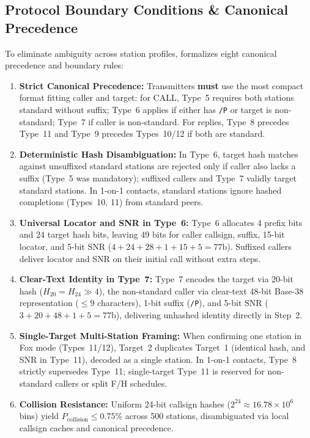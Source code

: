 \subsection{Protocol Boundary Conditions \& Canonical Precedence}
\label{sec:msg:limitations}

To eliminate ambiguity across station profiles, \LQ{} formalizes eight canonical precedence and boundary rules:
\begin{enumerate}[leftmargin=1.4em, itemsep=1.5pt plus 1pt minus 0.5pt, topsep=2pt, parsep=0pt]
  \item \textbf{Strict Canonical Precedence:} Transmitters \textbf{must} use the most compact format fitting caller and target: for CALL, Type~5 requires both stations standard without suffix; Type~6 applies if either has \texttt{/P} or target is non-standard; Type~7 if caller is non-standard. For replies, Type~8 precedes Type~11 and Type~9 precedes Types~10/12 if both are standard.
  \item \textbf{Deterministic Hash Disambiguation:} In Type~6, target hash matches against unsuffixed standard stations are rejected only if caller also lacks a suffix (Type~5 was mandatory); suffixed callers and Type~7 validly target standard stations. In 1-on-1 contacts, standard stations ignore hashed completions (Types~10, 11) from standard peers.
  \item \textbf{Universal Locator and SNR in Type~6:} Type~6 allocates 4 prefix bits and 24 target hash bits, leaving 49 bits for caller callsign, suffix, 15-bit locator, and 5-bit SNR ($4+24+28+1+15+5=77\text{b}$). Suffixed callers deliver locator and SNR on their initial call without extra steps.
  \item \textbf{Clear-Text Identity in Type~7:} Type~7 encodes the target via 20-bit hash ($H_{20} = H_{24} \gg 4$), the non-standard caller via clear-text 48-bit Base-38 representation ($\le 9$ characters), 1-bit suffix (\texttt{/P}), and 5-bit SNR ($3+20+48+1+5 = 77\text{b}$), delivering unhashed identity directly in Step~2.
  \item \textbf{Single-Target Multi-Station Framing:} When confirming one station in Fox mode (Types~11/12), Target~2 duplicates Target~1 (identical hash, and SNR in Type~11), decoded as a single station. In 1-on-1 contacts, Type~8 strictly supersedes Type~11; single-target Type~11 is reserved for non-standard callers or split F/H schedules.
  \item \textbf{Collision Resistance:} Uniform 24-bit callsign hashes ($2^{24} \approx 16.78\times 10^6$ bins) yield $P_{\text{collision}} \le 0.75\%$ across 500 stations, disambiguated via local callsign caches and canonical precedence.

\end{enumerate}
